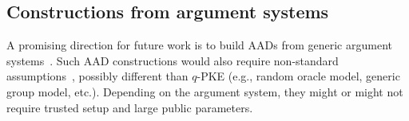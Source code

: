 
\subsection{Constructions from argument systems}
\label{s:snarks}%
%
%
%

%
%
%
A promising direction for future work is to build AADs from generic argument systems~\cite{groth10,groth16,qsp,cs-proofs,aurora,bulletproofs,ligero,hyrax,stark}.
Such AAD constructions would also require non-standard assumptions~\cite{GentryWichs2011}, possibly different than $q$-PKE (e.g., random oracle model, generic group model, etc.).
Depending on the argument system, they might or might not require trusted setup and large public parameters.

